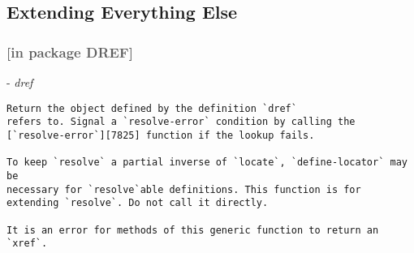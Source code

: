 \subsection{Extending Everything Else}\label{extending-everything-else}

\label{x-28DREF-EXT-3A-40EXTENDING-EVERYTHING-ELSE-20MGL-PAX-3ASECTION-29}

\subsubsection*{\normalfont\textcolor[HTML]{606060}{[in package DREF]}}
-
\label{x-28DREF-EXT-3ARESOLVE-2A-20GENERIC-FUNCTION-29}
\emph{dref}

\begin{verbatim}
Return the object defined by the definition `dref`
refers to. Signal a `resolve-error` condition by calling the
[`resolve-error`][7825] function if the lookup fails.

To keep `resolve` a partial inverse of `locate`, `define-locator` may be
necessary for `resolve`able definitions. This function is for
extending `resolve`. Do not call it directly.

It is an error for methods of this generic function to return an
`xref`.
\end{verbatim}

